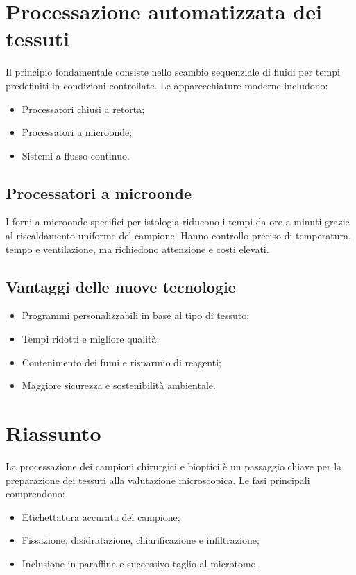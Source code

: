 \section{Processazione automatizzata dei tessuti}
Il principio fondamentale consiste nello scambio sequenziale di fluidi per tempi predefiniti in condizioni controllate.  
Le apparecchiature moderne includono:
\begin{itemize}
    \item Processatori chiusi a retorta;
    \item Processatori a microonde;
    \item Sistemi a flusso continuo.
\end{itemize}

\subsection{Processatori a microonde}
I forni a microonde specifici per istologia riducono i tempi da ore a minuti grazie al riscaldamento uniforme del campione. Hanno controllo preciso di temperatura, tempo e ventilazione, ma richiedono attenzione e costi elevati.

\subsection{Vantaggi delle nuove tecnologie}
\begin{itemize}
    \item Programmi personalizzabili in base al tipo di tessuto;
    \item Tempi ridotti e migliore qualità;
    \item Contenimento dei fumi e risparmio di reagenti;
    \item Maggiore sicurezza e sostenibilità ambientale.
\end{itemize}




\section{Riassunto}
La processazione dei campioni chirurgici e bioptici è un passaggio chiave per la preparazione dei tessuti alla valutazione microscopica.  
Le fasi principali comprendono:
\begin{itemize}
    \item Etichettatura accurata del campione;
    \item Fissazione, disidratazione, chiarificazione e infiltrazione;
    \item Inclusione in paraffina e successivo taglio al microtomo.
\end{itemize}

